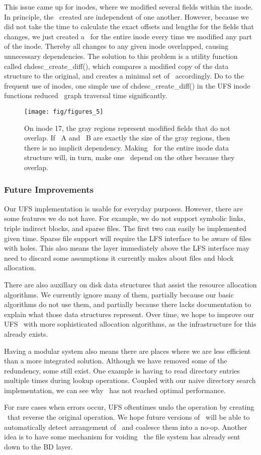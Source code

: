 This issue came up for inodes, where we modified several fields within the
inode. In principle, the \chdescs\ created are independent of one another.
However, because we did not take the time to calculate the exact offsets and
lengths for the fields that changes, we just created a \chdesc\ for the entire
inode every time we modified any part of the inode. Thereby all changes to any
given inode overlapped, causing unnecessary dependencies. The solution to this
problem is a utility function called chdesc\_create\_diff(), which compares a
modified copy of the data structure to the original, and creates a minimal set
of \chdescs\ accordingly. Do to the frequent use of inodes, one simple use of
chdesc\_create\_diff() in the UFS inode functions reduced \chdescs\ graph
traversal time significantly.

\begin{figure}[htb]
  \centering
  \texttt{[image: fig/figures\_5]}
  \caption{\label{fig:overlap} On inode 17, the gray regions represent
  modified fields that do not overlap. If \chdesc\ A and \chdesc\ B are
  exactly the size of the gray regions, then there is no implicit dependency.
  Making \chdescs\ for the entire inode data structure will, in turn, make
  one \chdesc\ depend on the other because they overlap.}
\end{figure}

\subsubsection {Future Improvements}
Our UFS implementation is usable for everyday purposes. However, there are
some features we do not have. For example, we do not support symbolic links,
triple indirect blocks, and sparse files. The first two can easily be
implemented given time. Sparse file support will require the LFS interface
to be aware of files with holes. This also means the layer immediately above
the LFS interface may need to discard some assumptions it currently makes
about files and block allocation.

There are also auxillary on disk data structures that assist the resource
allocation algorithms. We currently ignore many of them, partially because
our basic algorithms do not use them, and partially because there lacks
documentation to explain what those data structures represent. Over time,
we hope to improve our UFS \module\ with more sophisticated allocation
algorithms, as the infrastructure for this already exists.

Having a modular system also means there are places where we are less
efficient than a more integrated solution. Although we have removed some
of the redundency, some still exist. One example is having to read directory
entries multiple times during lookup operations. Coupled with our naive
directory search implementation, we can see why \Kudos\ has not reached
optimal performance.

For rare cases when errors occur, UFS oftentimes undo the operation by
creating \chdescs\ that reverse the original operation. We hope future
versions of \Kudos\  will be able to automatically detect arrangement of
\chdescs\ and coalesce them into a no-op. Another idea is to have some
mechanism for voiding \chdescs\ the file system has already sent down to the
BD layer.
